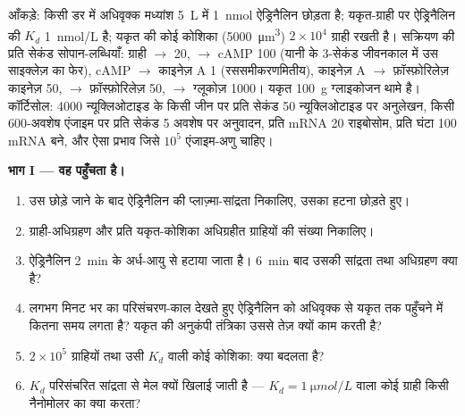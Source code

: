 \begin{problem}
\label{pb:b2:cell-signalling:1}
आँकड़े: किसी डर में अधिवृक्क मध्यांश \qty{5}{L}  में
\qty{1}{nmol} ऐड्रिनैलिन छोड़ता है; यकृत-ग्राही पर ऐड्रिनैलिन की $K_d$
\qty{1}{nmol/L} है; यकृत की कोई कोशिका (\qty{5000}{\micro m^3})
$2\times 10^{4}$ ग्राही रखती है। सक्रियण की प्रति सेकंड सोपान-लब्धियाँ:
ग्राही $\to$  20,  $\to$ cAMP 100
(यानी  के 3-सेकंड जीवनकाल में उस साइक्लेज़ का फेर),
cAMP $\to$ काइनेज़ A 1 (रससमीकरणमितीय), काइनेज़ A $\to$ फ़ॉस्फ़ोरिलेज़
काइनेज़ 50, $\to$ फ़ॉस्फ़ोरिलेज़ 50, $\to$ ग्लूकोज़ 1000। यकृत
\qty{100}{g} ग्लाइकोजन थामे है। कॉर्टिसोल: \qty{4000}{}
न्यूक्लिओटाइड के किसी जीन पर प्रति सेकंड \qty{50}{} न्यूक्लिओटाइड पर
अनुलेखन, किसी \num{600}-अवशेष एंजाइम पर प्रति सेकंड \qty{5}{} अवशेष पर
अनुवादन, प्रति mRNA \num{20} राइबोसोम, प्रति घंटा \num{100}
mRNA बने, और ऐसा प्रभाव जिसे $10^{5}$ एंजाइम-अणु चाहिए।

\medskip
\noindent\textbf{भाग I --- वह  पहुँचता है।}
\begin{enumerate}
  \item उस छोड़े जाने के बाद ऐड्रिनैलिन की प्लाज़्मा-सांद्रता
        निकालिए, उसका हटना छोड़ते हुए।
  \item ग्राही-अधिग्रहण और प्रति यकृत-कोशिका अधिग्रहीत
        ग्राहियों की संख्या निकालिए।
  \item ऐड्रिनैलिन \qty{2}{min} के अर्ध-आयु से हटाया जाता है।
        \qty{6}{min} बाद उसकी सांद्रता तथा अधिग्रहण क्या है?
  \item लगभग मिनट भर का परिसंचरण-काल देखते हुए ऐड्रिनैलिन को
        अधिवृक्क से यकृत तक पहुँचने में कितना समय लगता है? यकृत की
        अनुकंपी तंत्रिका उससे तेज़ क्यों काम करती है?
  \item $2\times 10^{5}$ ग्राहियों तथा उसी $K_d$ वाली कोई कोशिका:
        क्या बदलता है?
  \item $K_d$ परिसंचरित सांद्रता से मेल क्यों खिलाई जाती है ---
        $K_d = \qty{1}{\micro mol/L}$ वाला कोई ग्राही किसी
        नैनोमोलर  का क्या करता?
\end{enumerate}


\end{problem}
